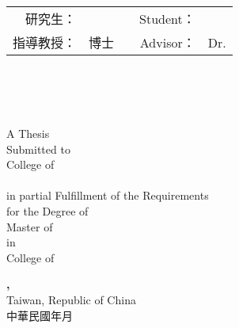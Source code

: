 \begin{center}
	\fontsize{18}{27pt}\selectfont
		\titleCh\\
		\titleEn\\[1cm]

	\fontsize{14}{14pt}\selectfont
	\begin{singlespace}
		\begin{tabular}{r l c r l}
			研究生： & \studentCh & \hspace{3cm} & Student： & \studentEn \\
			指導教授： & \advisorCh  \hspace{0.1cm} 博士 & \hspace{3cm} & Advisor： & Dr. \advisorEn \\[1.5cm]
		\end{tabular}
	\end{singlespace}

	\fontsize{14}{21pt}\selectfont
		\universityCh \\
		\instituteCh\\
		\masterThesisCh \\[1cm]

	\fontsize{14}{14pt}\selectfont
	\begin{singlespace}
	A Thesis \\
	Submitted to \instituteEn \\
	College of \collegeEn \\
	\universityEn \\
	in partial Fulfillment of the Requirements\\
	for the Degree of \\
	Master of \instituteEn\\
	in\\
	College of \collegeEn \\
	\end{singlespace}

\end{center}

\vspace{\fill}
\vspace{3cm}
	
\begin{center}
	\fontsize{18}{27pt}\selectfont
	{\Large \textbf{, }}\\
	{\Large Taiwan, Republic of China}\\
	{\Large 中華民國 年 月}
\end{center}
